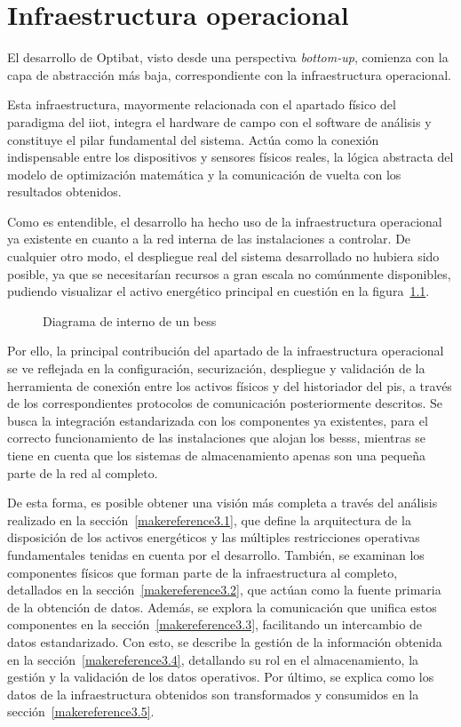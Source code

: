 \chapter{Infraestructura operacional}
\label{makereference3}

El desarrollo de Optibat, visto desde una perspectiva \textit{bottom-up}, comienza con la capa de abstracción más baja, correspondiente con la infraestructura operacional.

Esta infraestructura, mayormente relacionada con el apartado físico del paradigma del \gls{iiot}, integra el hardware de campo con el software de análisis y constituye el pilar fundamental del sistema. Actúa como la conexión indispensable entre los dispositivos y sensores físicos reales, la lógica abstracta del modelo de optimización matemática y la comunicación de vuelta con los resultados obtenidos.

Como es entendible, el desarrollo ha hecho uso de la infraestructura operacional ya existente en cuanto a la red interna de las instalaciones a controlar. De cualquier otro modo, el despliegue real del sistema desarrollado no hubiera sido posible, ya que se necesitarían recursos a gran escala no comúnmente disponibles, pudiendo visualizar el activo energético principal en cuestión en la figura~\ref{fig:diagrama-bess}.

\begin{figure}
  \centering
  
  \caption{Diagrama de interno de un \gls{bess}~\cite{iberdrola2024bess}}
  \label{fig:diagrama-bess}
\end{figure}

Por ello, la principal contribución del apartado de la infraestructura operacional se ve reflejada en la configuración, securización, despliegue y validación de la herramienta de conexión entre los activos físicos y del historiador del \gls{pis}, a través de los correspondientes protocolos de comunicación posteriormente descritos. Se busca la integración estandarizada con los componentes ya existentes, para el correcto funcionamiento de las instalaciones que alojan los \glspl{bess}, mientras se tiene en cuenta que los sistemas de almacenamiento apenas son una pequeña parte de la red al completo.

De esta forma, es posible obtener una visión más completa a través del análisis realizado en la sección~\ref{makereference3.1}, que define la arquitectura de la disposición de los activos energéticos y las múltiples restricciones operativas fundamentales tenidas en cuenta por el desarrollo. También, se examinan los componentes físicos que forman parte de la infraestructura al completo, detallados en la sección~\ref{makereference3.2}, que actúan como la fuente primaria de la obtención de datos. Además, se explora la comunicación que unifica estos componentes en la sección~\ref{makereference3.3},  facilitando un intercambio de datos estandarizado. Con esto, se describe la gestión de la información obtenida en la sección~\ref{makereference3.4}, detallando su rol en el almacenamiento, la gestión y la validación de los datos operativos. Por último, se explica como los datos de la infraestructura obtenidos son transformados y consumidos en la sección~\ref{makereference3.5}.

